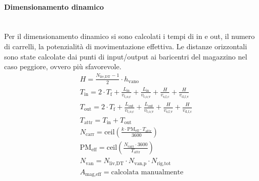 \documentclass[11pt]{article}
\begin{document}
\paragraph{Dimensionamento dinamico}\mbox{}\\
Per il dimensionamento dinamico si sono calcolati i tempi di in e out, il numero di carrelli, la potenzialità di movimentazione effettiva. Le distanze orizzontali sono state calcolate dai punti di input/output ai baricentri del magazzino nel caso peggiore, ovvero più sfavorevole.
\begin{align}
    & H = \frac{N_{\text{liv,DT}} - 1}{2} \cdot h_{\text{vano}} \\
    & T_{\text{in}} = 2 \cdot T_{\text{f}} + \frac{L_{\text{in}}}{v_{\text{t,o,c}}} + \frac{L_{\text{in}}}{v_{\text{t,o,v}}} + \frac{H}{v_{\text{s,f,c}}} + \frac{H}{v_{\text{d,f,v}}} \\
    & T_{\text{out}} = 2 \cdot T_{\text{f}} + \frac{L_{\text{out}}}{v_{\text{t,o,c}}} + \frac{L_{\text{out}}}{v_{\text{t,o,v}}} + \frac{H}{v_{\text{s,f,v}}} + \frac{H}{v_{\text{d,f,c}}} \\
    & T_{\text{attr}} = T_{\text{in}} + T_{\text{out}} \\
    & N_{\text{carr}} = \text{ceil}\left(\frac{k \cdot \text{PM}_{\text{eff}} \cdot T_{\text{attr}}}{3600}\right) \\
    & \text{PM}_{\text{eff}} = \text{ceil}\left(\frac{N_{\text{carr}} \cdot 3600}{T_{\text{attr}}}\right) \\
    & N_{\text{van}} = N_{\text{liv,DT}} \cdot N_{\text{van,p}} \cdot N_{\text{rig,tot}} \\
    & A_{\text{mag,eff}} = \text{calcolata manualmente}
\end{align}
\end{document}
